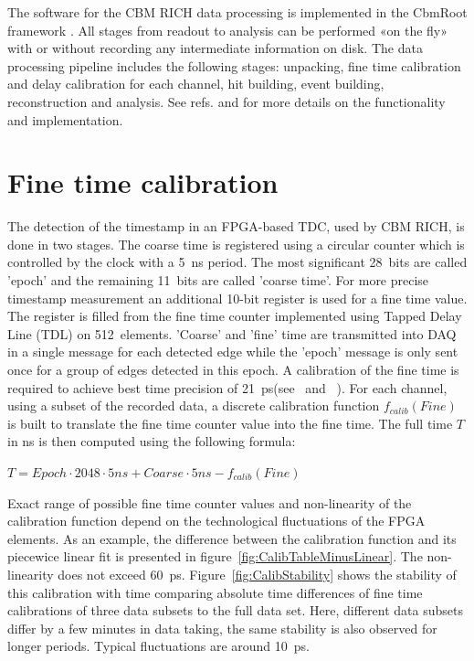 \documentclass[final,5p,times,twocolumn]{elsarticle}
\begin{document}
The software for the CBM RICH data processing is implemented in the CbmRoot framework \cite{SEMEN}. All stages from readout to analysis can be performed «on the fly» with or without recording any intermediate information on disk. The data processing pipeline includes the following stages: unpacking, fine time calibration and delay calibration for each channel, hit building, event building, reconstruction and analysis. See refs. \cite{PEPAN} and \cite{RINGS} for more details on the functionality and implementation.

\section{Fine time calibration}

The detection of the timestamp in an FPGA-based TDC, used by CBM RICH, is done in two stages. The coarse time is registered using a circular counter which is controlled by the clock with a 5~ns period. The most significant 28~bits are called 'epoch' and the remaining 11~bits are called 'coarse time'. For more precise timestamp measurement an additional 10-bit register is used for a fine time value. The register is filled from the fine time counter implemented using Tapped Delay Line (TDL) on 512~elements.
'Coarse' and 'fine' time are transmitted into DAQ in a single message for each detected edge while the 'epoch' message is only sent once for a group of edges detected in this epoch.
A calibration of the fine time is required to achieve best time precision of 21~ps(see~\cite{FINECALIB} and ~\cite{PEPAN}). For each channel, using a subset of the recorded data, a discrete calibration function $ f_{calib}(Fine) $ is built to translate the fine time counter value into the fine time. The full time $ T $ in ns is then computed using the following formula:

{\centering
$ T = Epoch \cdot 2048 \cdot 5ns + Coarse \cdot 5ns - f_{calib}(Fine) $ \\
}

Exact range of possible fine time counter values and non-linearity of the calibration function depend on the technological fluctuations of the FPGA elements. As an example, the difference between the calibration function and its piecewice linear fit is presented in figure~\ref{fig:CalibTableMinusLinear}. The non-linearity does not exceed 60~ps. Figure~\ref{fig:CalibStability} shows the stability of this calibration with time comparing absolute time differences of fine time calibrations of three data subsets to the full data set. Here, different data subsets differ by a few minutes in data taking, the same stability is also observed for longer periods. Typical fluctuations are around 10~ps.
\end{document}
